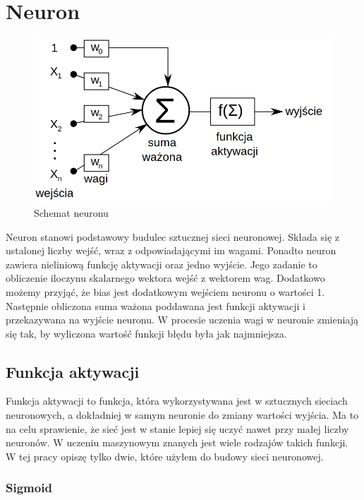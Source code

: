 \documentclass{report}
\begin{document}
    \section{Neuron}

    \begin{figure}[h!]
        \centering
        \includegraphics[scale=0.4]{./img/neuron.png}
        \caption{Schemat neuronu}
    \end{figure}

    Neuron stanowi podstawowy budulec sztucznej sieci neuronowej.
    Składa się z ustalonej liczby wejść, wraz z odpowiadającymi im wagami.
    Ponadto neuron zawiera nieliniową funkcję aktywacji oraz jedno wyjście.
    Jego zadanie to obliczenie iloczynu skalarnego wektora wejść z wektorem wag.
    Dodatkowo możemy przyjąć, że bias jest dodatkowym wejściem neuronu o wartości 1.
    Następnie obliczona suma ważona poddawana jest funkcji aktywacji i przekazywana na wyjście neuronu.
    W procesie uczenia wagi w neuronie zmieniają się tak, by wyliczona wartość funkcji błędu była jak najmniejsza.

    \subsection{Funkcja aktywacji}

    Funkcja aktywacji to funkcja, która wykorzystywana jest w sztucznych sieciach neuronowych, a dokładniej w samym neuronie do zmiany wartości wyjścia.
    Ma to na celu sprawienie, że sieć jest w stanie lepiej się uczyć nawet przy małej liczby neuronów.
    W uczeniu maszynowym znanych jest wiele rodzajów takich funkcji.
    W tej pracy opiszę tylko dwie, które użyłem do budowy sieci neuronowej.

    \subsubsection{Sigmoid}
\end{document}
